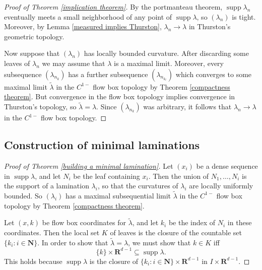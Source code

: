 \documentclass[reqno,11pt]{amsart}
\newcommand{\NN}{\mathbf{N}}
\newcommand{\RR}{\mathbf{R}}
\DeclareMathOperator{\supp}{supp}
\theoremstyle{definition}
\numberwithin{equation}{section}
\begin{document}
\begin{proof}[Proof of Theorem \ref{implication theorem}]
By the portmanteau theorem, $\supp \lambda_n$ eventually meets a small neighborhood of any point of $\supp \lambda$, so $(\lambda_n)$ is tight.
Moreover, by Lemma \ref{measured implies Thurston}, $\lambda_n \to \lambda$ in Thurston's geometric topology.

Now suppose that $(\lambda_n)$ has locally bounded curvature.
After discarding some leaves of $\lambda_n$ we may assume that $\lambda$ is a maximal limit.
Moreover, every subsequence $(\lambda_{n_k})$ has a further subsequence $(\lambda_{n_{k_\ell}})$ which converges to some maximal limit $\tilde \lambda$ in the $C^{1-}$ flow box topology by Theorem \ref{compactness theorem}.
But convergence in the flow box topology implies convergence in Thurston's topology, so $\tilde \lambda = \lambda$.
Since $(\lambda_{n_k})$ was arbitrary, it follows that $\lambda_n \to \lambda$ in the $C^{1-}$ flow box topology.
\end{proof}


\subsection{Construction of minimal laminations}

\begin{proof}[Proof of Theorem \ref{building a minimal lamination}]
Let $(x_i)$ be a dense sequence in $\supp \lambda$, and let $N_i$ be the leaf containing $x_i$.
Then the union of $N_1, \dots, N_i$ is the support of a lamination $\lambda_i$, so that the curvatures of $\lambda_i$ are locally uniformly bounded.
So $(\lambda_i)$ has a maximal subsequential limit $\tilde \lambda$ in the $C^{1-}$ flow box topology by Theorem \ref{compactness theorem}.

Let $(x, k)$ be flow box coordinates for $\tilde \lambda$, and let $k_i$ be the index of $N_i$ in these coordinates.
Then the local set $K$ of leaves is the closure of the countable set $\{k_i: i \in \NN\}$.
In order to show that $\tilde \lambda = \lambda$, we must show that $k \in K$ iff
$$\{k\} \times \RR^{d - 1} \subseteq \supp \lambda.$$
This holds because $\supp \lambda$ is the closure of $\{k_i: i \in \NN\} \times \RR^{d - 1}$ in $I \times \RR^{d - 1}$.
\end{proof}
\end{document}
